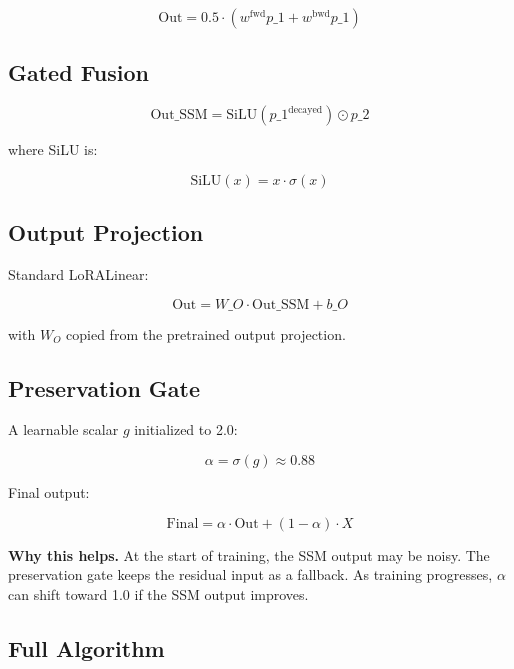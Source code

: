 \[
\text{Out} = 0.5 \cdot (w^\text{fwd} p\_1 + w^\text{bwd} p\_1)
\tag{4.9}
\]

\subsection{Gated Fusion}

\[
\text{Out}\_\text{SSM} = \text{SiLU}(p\_1^\text{decayed}) \odot p\_2
\tag{4.10}
\]

where SiLU is:

\[
\text{SiLU}(x) = x \cdot \sigma(x)
\tag{4.11}
\]

\subsection{Output Projection}

Standard LoRALinear:

\[
\text{Out} = W\_O \cdot \text{Out}\_\text{SSM} + b\_O
\tag{4.12}
\]

with $W_O$ copied from the pretrained output projection.

\subsection{Preservation Gate}

A learnable scalar $g$ initialized to 2.0:

\[
\alpha = \sigma(g) \approx 0.88
\tag{4.13}
\]

Final output:

\[
\text{Final} = \alpha \cdot \text{Out} + (1 - \alpha) \cdot X
\tag{4.14}
\]

\textbf{Why this helps.} At the start of training, the SSM output may be noisy. 
The preservation gate keeps the residual input as a fallback. As training 
progresses, $\alpha$ can shift toward 1.0 if the SSM output improves.

\subsection{Full Algorithm}

